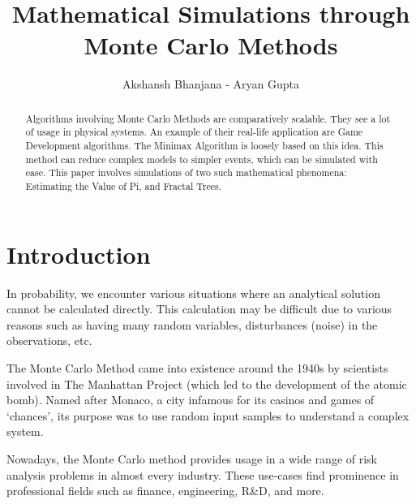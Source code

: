 \documentclass{resonance}
\begin{document}
\title{Mathematical Simulations through Monte Carlo Methods}
\author{Akshansh Bhanjana - Aryan Gupta}

\maketitle
{}

\begin{abstract}
Algorithms involving Monte Carlo Methods are comparatively scalable. They see a lot of usage in physical systems. An example of their real-life application are Game Development algorithms. The Minimax Algorithm is loosely based on this idea. This method can reduce complex models to simpler events, which can be simulated with ease. This paper involves simulations of two such mathematical phenomena: Estimating the Value of Pi, and Fractal Trees.
\end{abstract}



\section*{Introduction}
In probability, we encounter various situations where an analytical solution cannot be calculated directly. This calculation may be difficult due to various reasons such as having many random variables, disturbances (noise) in the observations, etc.

The Monte Carlo Method came into existence around the 1940s by scientists involved in The Manhattan Project (which led to the development of the atomic bomb). Named after Monaco, a city infamous for its casinos and games of ‘chances’, its purpose was to use random input samples to understand a complex system. 

Nowadays, the Monte Carlo method provides usage in a wide range of risk analysis problems in almost every industry. These use-cases find prominence in professional fields such as finance, engineering, R\&D, and more.
\end{document}
